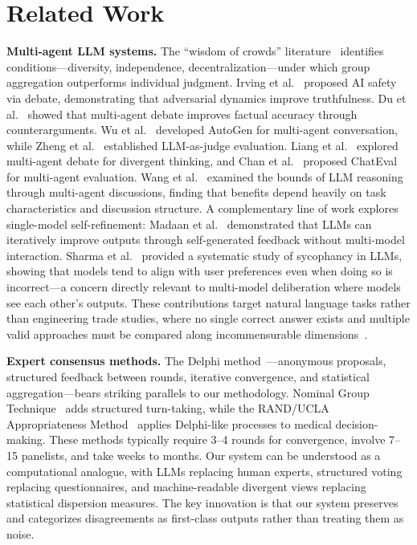 \documentclass[11pt,a4paper]{article}
\begin{document}
\section{Related Work}
\label{sec:related}

\textbf{Multi-agent LLM systems.} The ``wisdom of crowds'' literature~\cite{surowiecki2004wisdom} identifies conditions---diversity, independence, decentralization---under which group aggregation outperforms individual judgment. Irving et al.~\cite{irving2018debate} proposed AI safety via debate, demonstrating that adversarial dynamics improve truthfulness. Du et al.~\cite{du2023debate} showed that multi-agent debate improves factual accuracy through counterarguments. Wu et al.~\cite{wu2023autogen} developed AutoGen for multi-agent conversation, while Zheng et al.~\cite{zheng2024judging} established LLM-as-judge evaluation. Liang et al.~\cite{liang2024encouraging} explored multi-agent debate for divergent thinking, and Chan et al.~\cite{chan2024chateval} proposed ChatEval for multi-agent evaluation. Wang et al.~\cite{wang2024rethinking} examined the bounds of LLM reasoning through multi-agent discussions, finding that benefits depend heavily on task characteristics and discussion structure. A complementary line of work explores single-model self-refinement: Madaan et al.~\cite{madaan2023self} demonstrated that LLMs can iteratively improve outputs through self-generated feedback without multi-model interaction. Sharma et al.~\cite{sharma2024sycophancy} provided a systematic study of sycophancy in LLMs, showing that models tend to align with user preferences even when doing so is incorrect---a concern directly relevant to multi-model deliberation where models see each other's outputs. These contributions target natural language tasks rather than engineering trade studies, where no single correct answer exists and multiple valid approaches must be compared along incommensurable dimensions~\cite{keeney1976decisions}.

\textbf{Expert consensus methods.} The Delphi method~\cite{linstone1975delphi,dalkey1963experimental}---anonymous proposals, structured feedback between rounds, iterative convergence, and statistical aggregation---bears striking parallels to our methodology. Nominal Group Technique~\cite{delbecq1975group} adds structured turn-taking, while the RAND/UCLA Appropriateness Method~\cite{fitch2001rand} applies Delphi-like processes to medical decision-making. These methods typically require 3--4 rounds for convergence, involve 7--15 panelists, and take weeks to months. Our system can be understood as a computational analogue, with LLMs replacing human experts, structured voting replacing questionnaires, and machine-readable divergent views replacing statistical dispersion measures. The key innovation is that our system preserves and categorizes disagreements as first-class outputs rather than treating them as noise.
\end{document}
